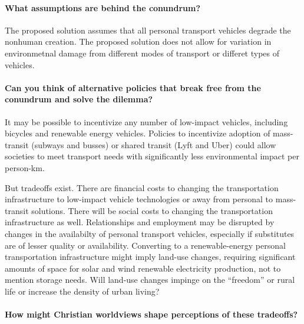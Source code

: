 \documentclass[12pt]{article}
\begin{document}
\paragraph{What assumptions are behind the conundrum?} 

The proposed solution assumes that all personal transport vehicles degrade the nonhuman creation. 
The proposed solution does not allow for variation in environmetnal damage
from different modes of transport or differet types of vehicles.

\paragraph{Can you think of alternative policies that break free from the conundrum and solve the dilemma?} 

It may be possible to incentivize any number of low-impact vehicles, including 
bicycles and renewable energy vehicles.
Policies to incentivize adoption of 
mass-transit (subways and busses) or shared transit (Lyft and Uber)
could allow societies to meet transport needs with significantly less environmental impact 
per person-km.

But tradeoffs exist. 
There are financial costs to changing the transportation infrastructure to low-impact vehicle technologies
or away from personal to mass-transit solutions. 
There will be social costs to changing the transportation infrastructure as well.
Relationships and employment may be disrupted by changes in the availabilty of personal transport vehicles,
especially if substitutes are of lesser quality or availability.
Converting to a renewable-energy personal transportation infrastructure 
might imply land-use changes, 
requiring significant amounts of space for solar and wind renewable electricity production,
not to mention storage needs. 
Will land-use changes impinge on the ``freedom'' or rural life 
or increase the density of urban living?

\paragraph{How might Christian worldviews shape perceptions of these tradeoffs?} 
\end{document}
